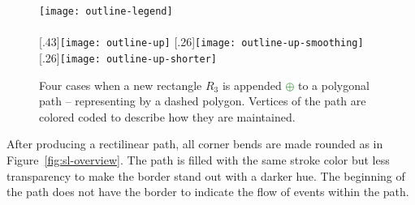 \begin{figure}[!htb]
	\centering
	\texttt{[image: outline-legend]}\bigskip\\
	\\
	[.43\linewidth]{\texttt{[image: outline-up]}}
	\hfill
	[.26\linewidth]{\texttt{[image: outline-up-smoothing]}}
	\hfill
	[.26\linewidth]{\texttt{[image: outline-up-shorter]}}
	\caption{Four cases when a new rectangle \colorbox{f2!40}{$R_3$} is appended \textcolor{ForestGreen}{$\pmb{\oplus}$} to a polygonal path -- representing by a dashed polygon. Vertices of the path are colored coded to describe how they are maintained.}
	\label{fig:sl-outline}
\end{figure}

After producing a rectilinear path, all corner bends are made rounded as in Figure~\ref{fig:sl-overview}. The path is filled with the same stroke color but less transparency to make the border stand out with a darker hue. The beginning of the path does not have the border to indicate the flow of events within the path. 